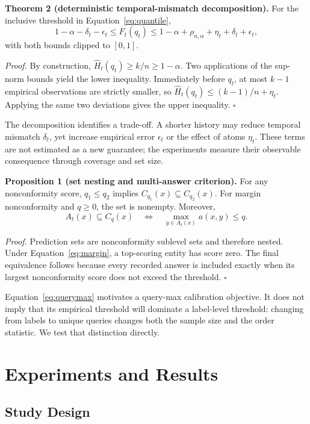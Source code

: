 \documentclass[information,article,submit,oneauthor,pdftex]{Definitions/mdpi}
\begin{document}
\noindent\textbf{Theorem 2 (deterministic temporal-mismatch decomposition).}\quad
For the inclusive threshold in Equation~\eqref{eq:quantile},
\[
 1-\alpha-\delta_t-\epsilon_t
 \le F_t(q_t)\le
 1-\alpha+\rho_{n,\alpha}+\eta_t+\delta_t+\epsilon_t,
 \tag{5}\label{eq:decomposition}
\]
with both bounds clipped to \([0,1]\).

\emph{Proof.}
By construction, \(\widehat H_t(q_t)\ge k/n\ge1-\alpha\). Two applications of
the sup-norm bounds yield the lower inequality. Immediately before \(q_t\), at
most \(k-1\) empirical observations are strictly smaller, so
\(\widehat H_t(q_t)\le(k-1)/n+\eta_t\). Applying the same two deviations gives
the upper inequality. \hfill\(\square\)

The decomposition identifies a trade-off. A shorter history may reduce temporal
mismatch \(\delta_t\), yet increase empirical error \(\epsilon_t\) or the effect
of atoms \(\eta_t\). These terms are not estimated as a new guarantee; the
experiments measure their observable consequence through coverage and set size.

\noindent\textbf{Proposition 1 (set nesting and multi-answer criterion).}\quad
For any nonconformity score, \(q_1\le q_2\) implies
\(C_{q_1}(x)\subseteq C_{q_2}(x)\). For margin nonconformity and \(q\ge0\), the
set is nonempty. Moreover,
\[
 A_t(x)\subseteq C_q(x)
 \quad\Longleftrightarrow\quad
 \max_{y\in A_t(x)}a(x,y)\le q.
 \tag{6}\label{eq:querymax}
\]

\emph{Proof.}
Prediction sets are nonconformity sublevel sets and therefore nested. Under
Equation~\eqref{eq:margin}, a top-scoring entity has score zero. The final
equivalence follows because every recorded answer is included exactly when its
largest nonconformity score does not exceed the threshold. \hfill\(\square\)

Equation~\eqref{eq:querymax} motivates a query-max calibration objective. It
does not imply that its empirical threshold will dominate a label-level
threshold: changing from labels to unique queries changes both the sample size
and the order statistic. We test that distinction directly.

\section{Experiments and Results}
\label{sec:experiments}

\subsection{Study Design}
\end{document}
